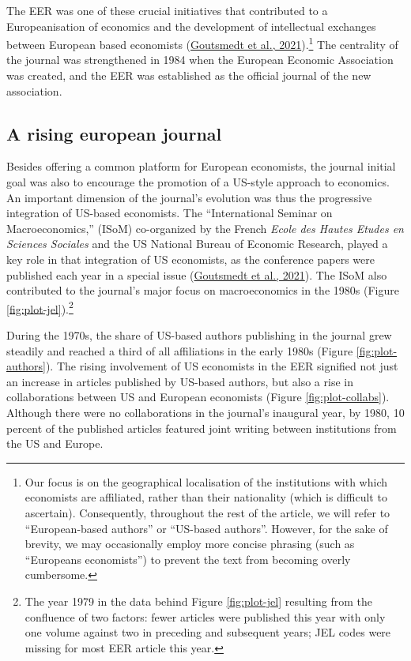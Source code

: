 \documentclass[
  12pt,
  onecolumn]{article}
\begin{document}
The EER was one of these crucial initiatives that contributed to a
Europeanisation of economics and the development of intellectual
exchanges between European based economists
(\protect\hyperlink{ref-goutsmedt2021}{Goutsmedt et al.,
2021}).\footnote{Our focus is on the geographical localisation of the
  institutions with which economists are affiliated, rather than their
  nationality (which is difficult to ascertain). Consequently,
  throughout the rest of the article, we will refer to ``European-based
  authors'' or ``US-based authors''. However, for the sake of brevity,
  we may occasionally employ more concise phrasing (such as ``Europeans
  economists'') to prevent the text from becoming overly cumbersome.}
The centrality of the journal was strengthened in 1984 when the European
Economic Association was created, and the EER was established as the
official journal of the new association.

\hypertarget{rising-journal}{%
\subsection{A rising european journal}\label{rising-journal}}

Besides offering a common platform for European economists, the journal
initial goal was also to encourage the promotion of a US-style approach
to economics. An important dimension of the journal's evolution was thus
the progressive integration of US-based economists. The ``International
Seminar on Macroeconomics,'' (ISoM) co-organized by the French
\emph{Ecole des Hautes Etudes en Sciences Sociales} and the US National
Bureau of Economic Research, played a key role in that integration of US
economists, as the conference papers were published each year in a
special issue (\protect\hyperlink{ref-goutsmedt2021}{Goutsmedt et al.,
2021}). The ISoM also contributed to the journal's major focus on
macroeconomics in the 1980s (Figure \ref{fig:plot-jel}).\footnote{The
  year 1979 in the data behind Figure \ref{fig:plot-jel} resulting from
  the confluence of two factors: fewer articles were published this year
  with only one volume against two in preceding and subsequent years;
  JEL codes were missing for most EER article this year.}

During the 1970s, the share of US-based authors publishing in the
journal grew steadily and reached a third of all affiliations in the
early 1980s (Figure \ref{fig:plot-authors}). The rising involvement of
US economists in the EER signified not just an increase in articles
published by US-based authors, but also a rise in collaborations between
US and European economists (Figure \ref{fig:plot-collabs}). Although
there were no collaborations in the journal's inaugural year, by 1980,
10 percent of the published articles featured joint writing between
institutions from the US and Europe.
\end{document}
